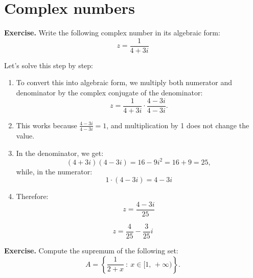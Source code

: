 \documentclass[a4paper,10 pt]{report}
\theoremstyle{definition}
\begin{document}


\chapter{Complex numbers}

\begin{exerciseBox}
\textbf{Exercise.} Write the following complex number in its algebraic form:
\[
    z = \frac{1}{4 + 3i}
\]
\end{exerciseBox}

\begin{solutionBox}
Let's solve this step by step:

\begin{enumerate}[leftmargin=*]
    \item To convert this into algebraic form, we multiply both numerator and denominator by the complex conjugate of the denominator:
    \[
        z = \frac{1}{4 + 3i} \cdot \frac{4 - 3i}{4 - 3i}.
    \]

    \item This works because $\frac{4 - 3i}{4 - 3i} = 1$, and multiplication by 1 does not change the value.

    \item In the denominator, we get:
    \[
        (4 + 3i)(4 - 3i) = 16 - 9i^2 = 16 + 9 = 25,
    \]
    while, in the numerator:
    \[
        1 \cdot (4 - 3i) = 4 - 3i
    \]

    \item Therefore:
    \[
        z = \frac{4 - 3i}{25}
    \]
\end{enumerate}

\begin{tcolorbox}[
    enhanced,
    colback=blue!5,
    colframe=blue!75!black,
    arc=0pt,
    boxrule=1pt,
    title=Final Answer,
    fonttitle=\bfseries,
    attach boxed title to top left={xshift=0mm, yshift=-\tcboxedtitleheight/2},
    boxed title style={
        colback=blue!75!black,
        coltext=white
    }
]
\[
    z = \frac{4}{25} - \frac{3}{25}i
\]
\end{tcolorbox}
\end{solutionBox}




\begin{exerciseBox}
\textbf{Exercise.} Compute the supremum of the following set:
\begin{equation*} A = \left\{ \frac{1}{2 + x} \: : \: x \in [1, \, + \infty) \right\}. \end{equation*}
\end{exerciseBox}
\end{document}
